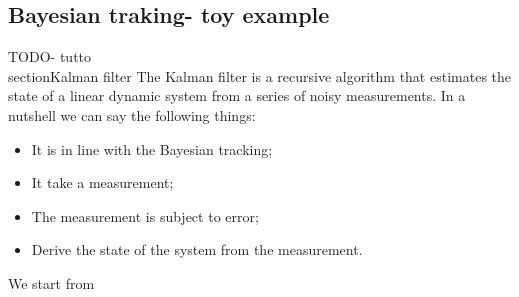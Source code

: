 \subsection{Bayesian traking- toy example}
TODO- tutto
\\section{Kalman filter}
The Kalman filter is a recursive algorithm that estimates the state of a linear dynamic system from a series of noisy measurements.
In a nutshell we can say the following things:
\begin{itemize}
    \item It is in line with the Bayesian tracking;
    \item It take a measurement;
    \item The measurement is subject to error;
    \item Derive the state of the system from the measurement.
\end{itemize}
We start from 